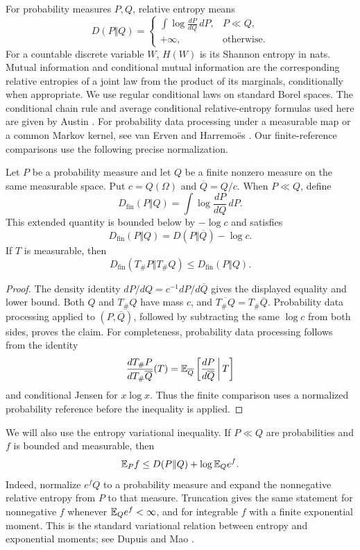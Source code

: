 For probability measures \(P,Q\), relative entropy means
\[
 D(P\Vert Q)=
 \begin{cases}
 \displaystyle\int\log\frac{dP}{dQ}\,dP,&P\ll Q,\\
 +\infty,&\text{otherwise}.
 \end{cases}
\]
For a countable discrete variable \(W\), \(H(W)\) is its Shannon
entropy in nats.  Mutual information and conditional mutual
information are the corresponding relative entropies of a joint law
from the product of its marginals, conditionally when appropriate.
We use regular conditional laws on standard Borel spaces.  The
conditional chain rule and average conditional relative-entropy
formulas used here are given by Austin
\cite[Lemma~3.6 and Equations~(13)--(18)]{Austin2020}.
For probability data processing under a measurable map or a common
Markov kernel, see van Erven and Harremo\"es
\cite[Theorems~5 and~9; Example~2]{vanErvenHarremoes2014}.
Our finite-reference comparisons use the following precise
normalization.

\begin{lemma}\label{lem:r-finite-reference}
Let \(P\) be a probability measure and let \(Q\) be a finite
nonzero measure on the same measurable space.  Put \(c=Q(\Omega)\)
and \(\overline Q=Q/c\).  When \(P\ll Q\), define
\[
 D_{\mathrm{fin}}(P\Vert Q)=\int\log\frac{dP}{dQ}\,dP.
\]
This extended quantity is bounded below by \(-\log c\) and satisfies
\[
 D_{\mathrm{fin}}(P\Vert Q)
     =D(P\Vert\overline Q)-\log c.
\]
If \(T\) is measurable, then
\[
 D_{\mathrm{fin}}(T_\#P\Vert T_\#Q)
 \le D_{\mathrm{fin}}(P\Vert Q).
\]
\end{lemma}

\begin{proof}
The density identity \(dP/dQ=c^{-1}dP/d\overline Q\) gives the
displayed equality and lower bound.  Both \(Q\) and \(T_\#Q\) have
mass \(c\), and \(\overline{T_\#Q}=T_\#\overline Q\).
Probability data processing applied to \((P,\overline Q)\), followed
by subtracting the same \(\log c\) from both sides, proves the claim.
For completeness, probability data processing follows from the
identity
\[
 \frac{dT_\#P}{dT_\#\overline Q}(T)
   =\mathbb E_{\overline Q}\left[\frac{dP}{d\overline Q}\,\middle|\,T\right]
\]
and conditional Jensen for \(x\log x\).  Thus the finite comparison
uses a normalized probability reference before the inequality is
applied.
\end{proof}

We will also use the entropy variational inequality.  If \(P\ll Q\)
are probabilities and \(f\) is bounded and measurable, then
\begin{equation}\label{eq:r-entropy-variational}
 \mathbb E_P f\le D(P\Vert Q)+\log\mathbb E_Q e^f.
\end{equation}
Indeed, normalize \(e^fQ\) to a probability measure and expand the
nonnegative relative entropy from \(P\) to that measure.  Truncation
gives the same statement for nonnegative \(f\) whenever
\(\mathbb E_Qe^f<\infty\), and for integrable \(f\) with a finite
exponential moment.  This is the standard variational relation
between entropy and exponential moments; see
Dupuis and Mao \cite[Equations~(1.1)--(1.2), pp.~1--2]{DupuisMao2022}.

